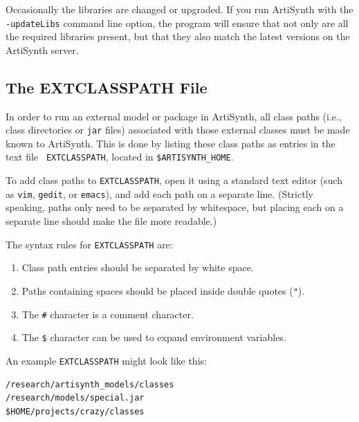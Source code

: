 \documentclass{article}
\def\directories{directories }
\begin{document}
Occasionally the libraries are changed or upgraded.  If you run
ArtiSynth with the {\tt -updateLibs} command line option, the program
will ensure that not only are all the required libraries present, but
that they also match the latest versions on the ArtiSynth server.

\subsection{The EXTCLASSPATH File}
\label{EXTCLASSPATHFile}

In order to run an external model or package in ArtiSynth, all class
paths (i.e., class \directories or {\tt jar} files) associated with
those external classes must be made known to ArtiSynth. This is done
by listing these class paths as entries in the text file {\tt
EXTCLASSPATH}, located in {\tt \$ARTISYNTH\_HOME}.

To add class paths to {\tt EXTCLASSPATH}, open it using a standard
text editor (such as {\tt vim}, {\tt gedit}, or {\tt emacs}), and add
each path on a separate line. (Strictly speaking, paths only need to
be separated by whitespace, but placing each on a separate line should
make the file more readable.)

The syntax rules for {\tt EXTCLASSPATH} are:

\begin{enumerate}

\item Class path entries should be separated by white space.

\item Paths containing spaces should be placed inside double quotes
({\tt "}).

\item The {\tt \#} character is a comment character.

\item The {\tt \$} character can be used to expand environment variables.

\end{enumerate}

An example {\tt EXTCLASSPATH} might look like this:

\begin{verbatim}
/research/artisynth_models/classes
/research/models/special.jar
$HOME/projects/crazy/classes
\end{verbatim}
\end{document}
